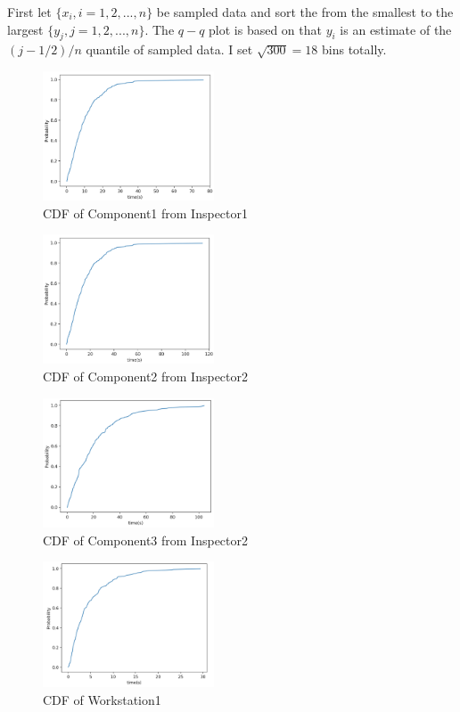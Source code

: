 \documentclass{article}
\begin{document}
First let ${\{x_i, i=1,2,...,n\}}$ be sampled data and sort the from the smallest to the largest ${\{y_j, j=1,2,...,n\}}$. The $q-q$ plot is based on that $y_i$ is an estimate of the $(j-1/2)/n$ quantile of sampled data. I set $\sqrt{300} = 18$ bins totally.

\begin{figure}[htbp]
\begin{center}
\includegraphics[width=2in]{cdf1.png}
\caption{CDF of Component1 from Inspector1}
\label{cdf1}
\end{center}
\end{figure}

\begin{figure}[htbp]
\begin{center}
\includegraphics[width=2in]{cdf2.png}
\caption{CDF of Component2 from Inspector2}
\label{cdf2}
\end{center}
\end{figure}

\begin{figure}[htbp]
\begin{center}
\includegraphics[width=2in]{cdf3.png}
\caption{CDF of Component3 from Inspector2}
\label{cdf3}
\end{center}
\end{figure}


\begin{figure}[htbp]
\begin{center}
\includegraphics[width=2in]{cdf4.png}
\caption{CDF of Workstation1}
\label{cdf4}
\end{center}
\end{figure}
\end{document}
